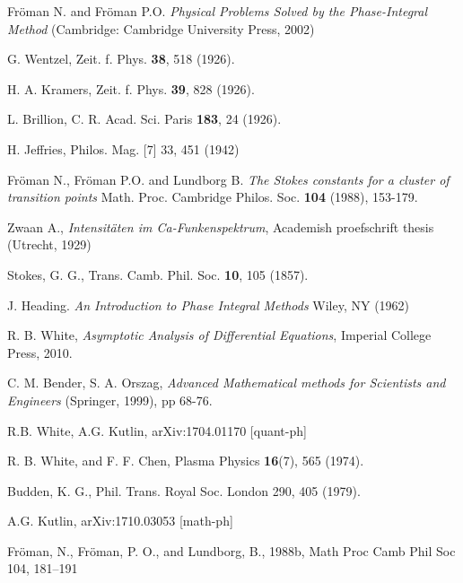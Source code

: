\documentclass[aip,jmp,reprint]{revtex4-1}
\begin{document}
\begin{thebibliography}{30}

 Fr\"oman N. and Fr\"oman P.O. \textit{Physical Problems Solved by the Phase-Integral Method} (Cambridge: Cambridge University Press, 2002)

 G. Wentzel, Zeit. f. Phys. \textbf{38}, 518 (1926).

 H. A. Kramers, Zeit. f. Phys. \textbf{39}, 828 (1926).

 L. Brillion, C. R. Acad. Sci. Paris \textbf{183}, 24 (1926).

 H. Jeffries, Philos. Mag. [7] 33, 451 (1942)

 Fr\"oman N., Fr\"oman P.O. and Lundborg B. \textit{The Stokes constants for a cluster of transition
points} Math. Proc. Cambridge Philos. Soc. \textbf{104} (1988), 153-179.

 Zwaan A., \textit{Intensit\"aten im Ca-Funkenspektrum}, Academish proefschrift thesis (Utrecht, 1929)

 Stokes, G. G., Trans. Camb. Phil. Soc. \textbf{10}, 105 (1857).

 J. Heading. {\it An Introduction to Phase Integral Methods} 
Wiley, NY (1962)

 R. B. White, {\it Asymptotic Analysis of Differential Equations}, Imperial College Press, 2010.

 C. M. Bender, S. A. Orszag, \textit{Advanced Mathematical methods for
Scientists and Engineers} (Springer, 1999), pp 68-76.

 R.B. White, A.G. Kutlin, 	arXiv:1704.01170 [quant-ph]

 R. B. White, and F. F. Chen, {Plasma Physics} \textbf{16}(7), 565 (1974).

 Budden, K. G., Phil. Trans. Royal Soc. London 290, 405 (1979).

  A.G. Kutlin, 	arXiv:1710.03053 [math-ph]

 Fr\"oman, N., Fr\"oman, P. O., and Lundborg, B., 1988b, Math Proc Camb Phil Soc 104, 181–191

\end{thebibliography}
\end{document}
